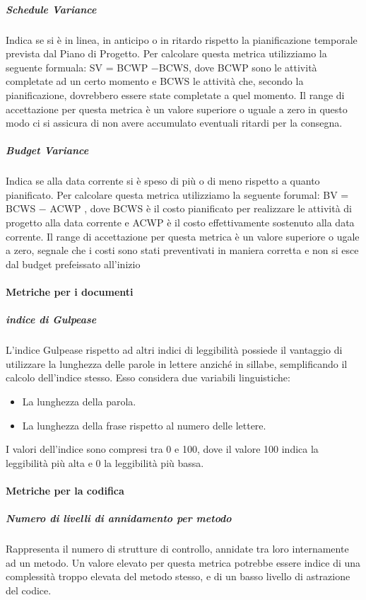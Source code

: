 \subparagraph{Schedule Variance}
Indica se si è in linea, in anticipo o in ritardo rispetto la pianificazione temporale prevista dal Piano di Progetto.
Per calcolare questa metrica utilizziamo la seguente formuala: SV = BCWP −BCWS, dove BCWP sono le attività completate ad un certo momento e BCWS
le attività che, secondo la pianificazione, dovrebbero essere state completate a quel momento.
Il range di accettazione per questa metrica è un valore superiore o uguale a zero in questo modo ci si assicura di non avere accumulato eventuali ritardi per la consegna.

\subparagraph{Budget Variance}
Indica se alla data corrente si è speso di più o di meno rispetto a quanto pianificato.
Per calcolare questa metrica utilizziamo la seguente forumal: BV = BCWS − ACWP , dove BCWS è il costo pianificato per realizzare le attività di progetto
alla data corrente e ACWP è il costo effettivamente sostenuto alla data corrente.
Il range di accettazione per questa metrica è un valore superiore o ugale a zero, segnale che i costi sono stati preventivati in maniera corretta e non si esce dal budget prefeissato all'inizio




\paragraph{Metriche per i documenti}
\subparagraph{indice di Gulpease}
L'indice Gulpease rispetto ad altri indici di leggibilità possiede il vantaggio di utilizzare la lunghezza delle parole in lettere anziché in sillabe, semplificando il calcolo dell'indice stesso. Esso considera due variabili linguistiche:
\begin{itemize}
\item La lunghezza della parola.
\item La lunghezza della frase rispetto al numero delle lettere.
\end{itemize}

I valori dell'indice sono compresi tra 0 e 100, dove il valore 100 indica la leggibilità più alta e 0 la leggibilità più bassa.

\paragraph{Metriche per la codifica}

\subparagraph{Numero di livelli di annidamento per metodo}
Rappresenta il numero di strutture di controllo, annidate tra loro internamente ad un metodo.
Un valore elevato per questa metrica potrebbe essere indice di una complessità troppo elevata del metodo stesso, e di un basso livello di astrazione del codice.

